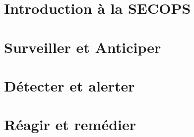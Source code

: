 
\chapter{Introduction à la SECOPS}





\chapter{Surveiller et Anticiper}












\chapter{Détecter et alerter}













\chapter{Réagir et remédier}

